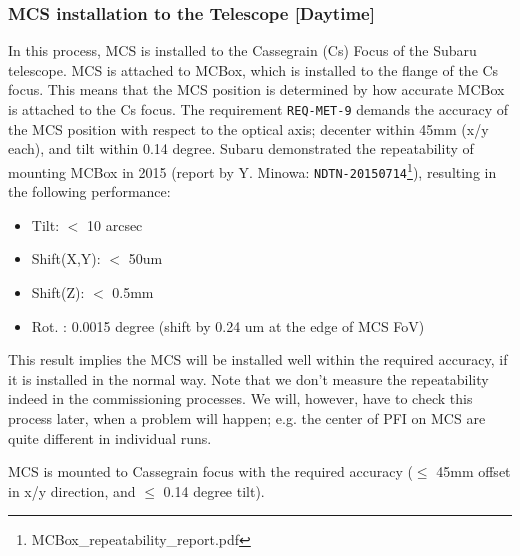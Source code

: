 \subsubsection{MCS installation to the Telescope [Daytime]}\label{secflow:MCSinstall}

In this process, MCS is installed to the Cassegrain (Cs) Focus of the Subaru telescope.
MCS is attached to MCBox, which is installed to the flange of the Cs focus. 
This means that the MCS position is determined by how accurate MCBox is attached to the Cs focus.
The requirement {\tt REQ-MET-9} demands the accuracy of the MCS position with respect to the optical axis; decenter within 45mm (x/y each), and tilt within 0.14 degree.
Subaru demonstrated the repeatability of mounting MCBox in 2015 (report by Y. Minowa: {\tt NDTN-20150714}\footnote{MCBox\_repeatability\_report.pdf}), resulting in the following performance:
\begin{itemize}
\item Tilt: $<$ 10 arcsec
\item Shift(X,Y): $<$ 50um
\item Shift(Z): $<$ 0.5mm
\item Rot. : 0.0015 degree (shift by 0.24 um at the edge of MCS FoV)
\end{itemize}
This result implies the MCS will be installed well within the required accuracy, if it is installed in the normal way.
Note that we don't measure the repeatability indeed in the commissioning processes.
We will, however, have to check this process later, when a problem will happen; e.g. the center of PFI on MCS are quite different in individual runs.





\begin{itembox}[l]{}
MCS is mounted to Cassegrain focus with the required accuracy ($\leq$ 45mm offset in x/y direction, and $\leq$ 0.14 degree tilt). 

\end{itembox}